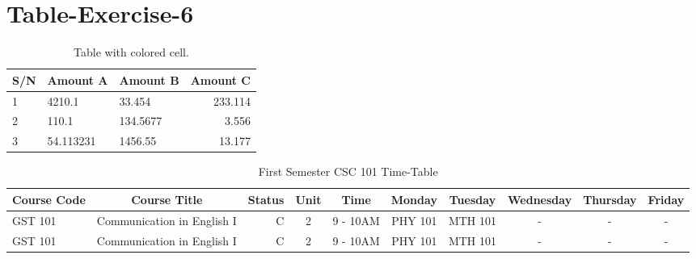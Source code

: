 \documentclass{article}
\begin{document}
\section{Table-Exercise-6}
\begin{table}[h!]
	\begin{center}
		\caption{Table with colored cell.}
		\label{tab:table1}
		\begin{tabular}{l|l|l|r}
			\hline
			\textbf{S/N} & \textbf{Amount A} & \textbf{Amount B} & \textbf{Amount C}\\
			\hline
			\cellcolor{blue!25}1 & 4210.1 & 33.454 & 233.114\\
			\cellcolor{green!20}2 & 110.1 & 134.5677 & 3.556\\
			\cellcolor{red!35}3 & 54.113231 & 1456.55 & 13.177\\
			\hline
		\end{tabular}
		\end{center}
\end{table}
\newpage
\begin{sidewaystable}
	\begin{center}
		\caption{First Semester CSC  101 Time-Table}
		\label{tab:table1}
		\begin{tabular}{l|c|r|c|c|c|c|c|c|c}
			\textbf{Course Code} & \textbf{Course Title} & \textbf{Status} & \textbf{Unit} & \textbf{Time} & \textbf{Monday} & \textbf{Tuesday} & \textbf{Wednesday} & \textbf{Thursday} & \textbf{Friday}\\
			\hline
			GST 101 & Communication in English I & C & 2 & 9 - 10AM & PHY 101 & MTH 101 & - & - & - \\
			\hline
			GST 101 & Communication in English I & C & 2 & 9 - 10AM & PHY 101 & MTH 101 & - & - & - \\
			\end{tabular}
		\end{center}
\end{sidewaystable}
\newpage



	
\end{document}
